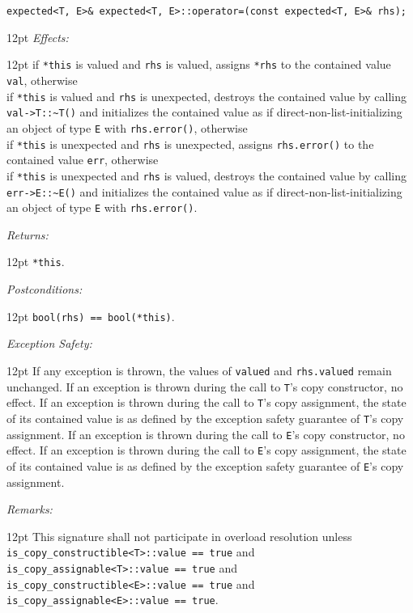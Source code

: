 \documentclass[a4paper,10pt]{article}
\newcommand{\cpp}[1]{\lstinline{#1}}
\newcommand{\wordingItem}[1]{\noindent\textit{#1:}}
\newenvironment{wordingTextItem}[1]{\wordingItem{#1}\vspace{7pt}\noindent\begin{adjustwidth}{12pt}{}}{\vspace{7pt}\end{adjustwidth}}
\newenvironment{wordingPara}{\begin{adjustwidth}{12pt}{}}{\end{adjustwidth}}
\begin{document}
\begin{lstlisting}[xleftmargin=0pt]
expected<T, E>& expected<T, E>::operator=(const expected<T, E>& rhs); 
\end{lstlisting}
\begin{wordingPara}
\begin{wordingTextItem}{Effects}
if \cpp{*this} is valued and \cpp{rhs} is valued, assigns \cpp{*rhs} to the contained value \cpp{val}, otherwise \\
if \cpp{*this} is valued and \cpp{rhs} is unexpected, destroys the contained value by calling \cpp{val->T::~T()} and  initializes the contained value as if direct-non-list-initializing an object of type \cpp{E} with \cpp{rhs.error()}, otherwise \\
if \cpp{*this} is unexpected and \cpp{rhs} is unexpected, assigns \cpp{rhs.error()} to the contained value \cpp{err}, otherwise \\
if \cpp{*this} is unexpected and \cpp{rhs} is valued, destroys the contained value by calling \cpp{err->E::~E()} and  initializes the contained value as if direct-non-list-initializing an object of type \cpp{E} with \cpp{rhs.error()}.
\end{wordingTextItem}
\begin{wordingTextItem}{Returns}
\cpp{*this}.
\end{wordingTextItem}
\begin{wordingTextItem}{Postconditions}
\cpp{bool(rhs) == bool(*this)}.
\end{wordingTextItem}
\begin{wordingTextItem}{Exception Safety}
If any exception is thrown, the values of \cpp{valued} and \cpp{rhs.valued} remain unchanged. If an exception is thrown during the call to \cpp{T}'s copy constructor, no effect. If an exception is thrown during the call to \cpp{T}'s copy assignment, the state of its contained value is as defined by the exception safety guarantee of \cpp{T}'s copy assignment. If an exception is thrown during the call to \cpp{E}'s copy constructor, no effect. If an exception is thrown during the call to \cpp{E}'s copy assignment, the state of its contained value is as defined by the exception safety guarantee of \cpp{E}'s copy assignment.
\end{wordingTextItem}
\begin{wordingTextItem}{Remarks}
This signature shall not participate in overload resolution unless\\
\cpp{is_copy_constructible<T>::value == true} and\\
\cpp{is_copy_assignable<T>::value == true} and\\
\cpp{is_copy_constructible<E>::value == true} and\\
\cpp{is_copy_assignable<E>::value == true}.
\end{wordingTextItem}

\end{wordingPara}
\end{document}
